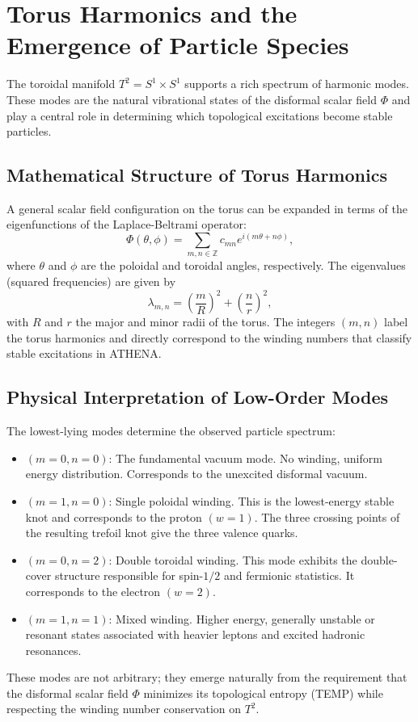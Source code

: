 \documentclass[11pt,a4paper]{article}
\begin{document}
\section{Torus Harmonics and the Emergence of Particle Species}

The toroidal manifold \(T^2 = S^1 \times S^1\) supports a rich spectrum of harmonic modes. These modes are the natural vibrational states of the disformal scalar field \(\Phi\) and play a central role in determining which topological excitations become stable particles.

\subsection{Mathematical Structure of Torus Harmonics}
A general scalar field configuration on the torus can be expanded in terms of the eigenfunctions of the Laplace-Beltrami operator:
\begin{equation}
\Phi (\theta ,\phi) = \sum_{m,n\in \mathbb{Z}}c_{mn}e^{i(m\theta +n\phi)}, \tag{21}
\end{equation}
where \(\theta\) and \(\phi\) are the poloidal and toroidal angles, respectively. The eigenvalues (squared frequencies) are given by
\begin{equation}
\lambda_{m,n} = \left(\frac{m}{R}\right)^2 +\left(\frac{n}{r}\right)^2, \tag{22}
\end{equation}
with \(R\) and \(r\) the major and minor radii of the torus. The integers \((m,n)\) label the torus harmonics and directly correspond to the winding numbers that classify stable excitations in ATHENA.

\subsection{Physical Interpretation of Low-Order Modes}
The lowest-lying modes determine the observed particle spectrum:
\begin{itemize}
\item \((m = 0, n = 0)\): The fundamental vacuum mode. No winding, uniform energy distribution. Corresponds to the unexcited disformal vacuum.
\item \((m = 1, n = 0)\): Single poloidal winding. This is the lowest-energy stable knot and corresponds to the proton \((w = 1)\). The three crossing points of the resulting trefoil knot give the three valence quarks.
\item \((m = 0, n = 2)\): Double toroidal winding. This mode exhibits the double-cover structure responsible for spin-\(1/2\) and fermionic statistics. It corresponds to the electron \((w = 2)\).
\item \((m = 1, n = 1)\): Mixed winding. Higher energy, generally unstable or resonant states associated with heavier leptons and excited hadronic resonances.
\end{itemize}
These modes are not arbitrary; they emerge naturally from the requirement that the disformal scalar field \(\Phi\) minimizes its topological entropy (TEMP) while respecting the winding number conservation on \(T^2\).
\end{document}
